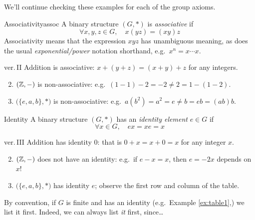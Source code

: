 We'll continue checking these examples for each of the group axioms.


\begin{defn}{Associativity}{assoc}
A binary structure $(G,\ast)$ is \emph{associative} if
\[\forall x,y,z\in G,\quad x(yz)=(xy)z\]
Associativity means that the expression $x y z$ has unambiguous meaning, as does the usual \emph{exponential/power} notation shorthand, e.g.\ $x^n=x\cdots x$.
\end{defn}

\begin{examples*}{ver.\,II}{}
\exstart Addition is associative: $x+(y+z)=(x+y)+z$ for any integers.\vspace{-2pt}
\begin{enumerate}\setcounter{enumi}{1}\itemsep2pt
  \item $(\mathbb{Z},-)$ is non-associative: e.g.\ $(1-1)-2=-2\neq 2=1-(1-2)$.
  \item $\bigl(\{e,a,b\},*\bigr)$ is non-associative: e.g.\ $a(b^2)=a^2=e\neq b=eb=(ab)b$.
\end{enumerate}
\end{examples*}

\goodbreak

\begin{defn}{Identity}{}
A binary structure $(G,\ast)$ has an \emph{identity element} $e\in G$ if
\[\forall x\in G,\quad ex=xe=x\]
\end{defn}

\begin{examples*}{ver.\,III}{}
\exstart Addition has identity 0: that is $0+x=x+0=x$ for any integer $x$.
\begin{enumerate}\setcounter{enumi}{1}\itemsep2pt
  \item $(\mathbb{Z},-)$ does not have an identity: e.g.\ if $e-x=x$, then $e=-2x$ depends on $x$!
  \item $\bigl(\{e,a,b\},*\bigr)$ has identity $e$; observe the first row and column of the table.
\end{enumerate}
\end{examples*}

By convention, if $G$ is finite and has an identity (e.g.\ Example \ref{ex:table1},) we list it first. Indeed, we can always list \emph{it} first, since\ldots

